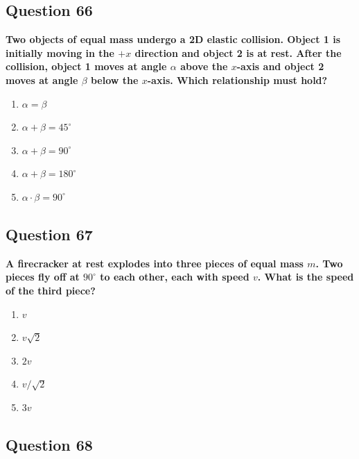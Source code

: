 \documentclass[12pt,letterpaper]{article}
\begin{document}
\subsection{Question 66}

\begin{questionbox}
\textbf{Two objects of equal mass undergo a 2D elastic collision. Object 1 is initially moving in the $+x$ direction and object 2 is at rest. After the collision, object 1 moves at angle $\alpha$ above the $x$-axis and object 2 moves at angle $\beta$ below the $x$-axis. Which relationship must hold?}

\begin{enumerate}[label=\alph*)]
    \item $\alpha = \beta$
    \item $\alpha + \beta = 45^\circ$
    \item $\alpha + \beta = 90^\circ$
    \item $\alpha + \beta = 180^\circ$
    \item $\alpha \cdot \beta = 90^\circ$
\end{enumerate}
\end{questionbox}

\subsection{Question 67}

\begin{questionbox}
\textbf{A firecracker at rest explodes into three pieces of equal mass $m$. Two pieces fly off at $90^\circ$ to each other, each with speed $v$. What is the speed of the third piece?}

\begin{enumerate}[label=\alph*)]
    \item $v$
    \item $v\sqrt{2}$
    \item $2v$
    \item $v/\sqrt{2}$
    \item $3v$
\end{enumerate}
\end{questionbox}

\subsection{Question 68}
\end{document}
